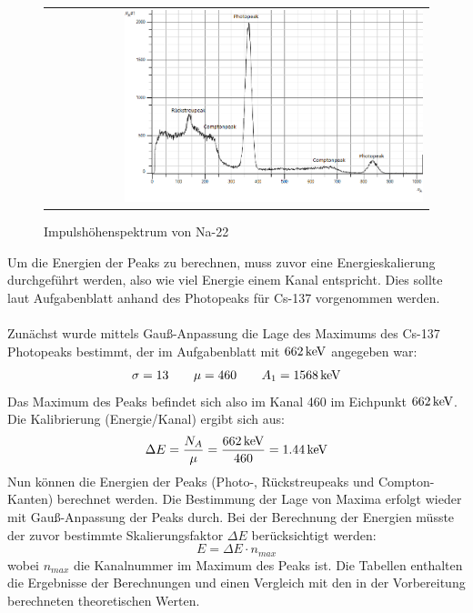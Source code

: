 \documentclass[a4paper,titlepage]{scrartcl}
\numberwithin{equation}{section}
\begin{document}
\begin{figure}[H]
		\centering
		\begin{tabular}{@{}r@{}}
			\includegraphics[width=0.8\textwidth]{bilder/aufgabe1/na22.png}\\
		\end{tabular}
		\caption{Impulshöhenspektrum von Na-22}
		\label{fig:na}
\end{figure}
Um die Energien der Peaks zu berechnen, muss zuvor eine Energieskalierung durchgeführt werden, also wie viel Energie einem Kanal entspricht. Dies sollte laut Aufgabenblatt anhand des Photopeaks für Cs-137 vorgenommen werden.\\ \\
Zunächst wurde mittels Gauß-Anpassung die Lage des Maximums des Cs-137 Photopeaks bestimmt, der im Aufgabenblatt mit $\unit[662]{keV}$ angegeben war:
\begin{equation*}
\sigma=13 \quad \quad \mu=460 \quad \quad A_1=\unit[1568]{keV}
\end{equation*}
Das Maximum des Peaks befindet sich also im Kanal 460 im Eichpunkt $\unit[662]{keV}$. Die Kalibrierung (Energie/Kanal) ergibt sich aus:
\begin{equation*}
\Delta E = \frac{N_A}{\mu}=\frac{\unit[662]{keV}}{460}=\unit[1.44]{keV}
\end{equation*}
Nun können die Energien der Peaks (Photo-, Rückstreupeaks und Compton-Kanten) berechnet werden. Die Bestimmung der Lage von Maxima erfolgt wieder mit Gauß-Anpassung der Peaks durch. Bei der Berechnung der Energien müsste der zuvor bestimmte Skalierungsfaktor $\Delta E$ berücksichtigt werden:
\begin{equation*}
E=\Delta E \cdot n_{max}
\end{equation*}
wobei $n_{max}$ die Kanalnummer im Maximum des Peaks ist. Die Tabellen enthalten die Ergebnisse der Berechnungen und einen Vergleich mit den in der Vorbereitung berechneten theoretischen Werten.
\end{document}
